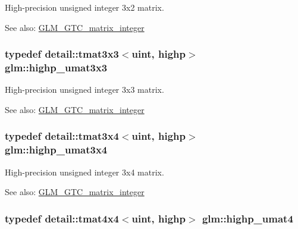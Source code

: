 High-precision unsigned integer 3x2 matrix. \begin{Desc}
\item[See also:]\hyperlink{group__gtc__matrix__integer}{GLM\_\-GTC\_\-matrix\_\-integer} \end{Desc}
\hypertarget{group__gtc__matrix__integer_g8dd9f8bfe06de34c8f1a942d2c2e094c}{
\subsubsection[highp\_\-umat3x3]{\setlength{\rightskip}{0pt plus 5cm}typedef detail::tmat3x3$<$uint, highp$>$ {\bf glm::highp\_\-umat3x3}}}
\label{group__gtc__matrix__integer_g8dd9f8bfe06de34c8f1a942d2c2e094c}


High-precision unsigned integer 3x3 matrix. \begin{Desc}
\item[See also:]\hyperlink{group__gtc__matrix__integer}{GLM\_\-GTC\_\-matrix\_\-integer} \end{Desc}
\hypertarget{group__gtc__matrix__integer_gbaeb2363acd07cc7f99918bae48ccc05}{
\subsubsection[highp\_\-umat3x4]{\setlength{\rightskip}{0pt plus 5cm}typedef detail::tmat3x4$<$uint, highp$>$ {\bf glm::highp\_\-umat3x4}}}
\label{group__gtc__matrix__integer_gbaeb2363acd07cc7f99918bae48ccc05}


High-precision unsigned integer 3x4 matrix. \begin{Desc}
\item[See also:]\hyperlink{group__gtc__matrix__integer}{GLM\_\-GTC\_\-matrix\_\-integer} \end{Desc}
\hypertarget{group__gtc__matrix__integer_gf12f0d2744e809e64469d27ef392aa98}{
\subsubsection[highp\_\-umat4]{\setlength{\rightskip}{0pt plus 5cm}typedef detail::tmat4x4$<$uint, highp$>$ {\bf glm::highp\_\-umat4}}}
\label{group__gtc__matrix__integer_gf12f0d2744e809e64469d27ef392aa98}


